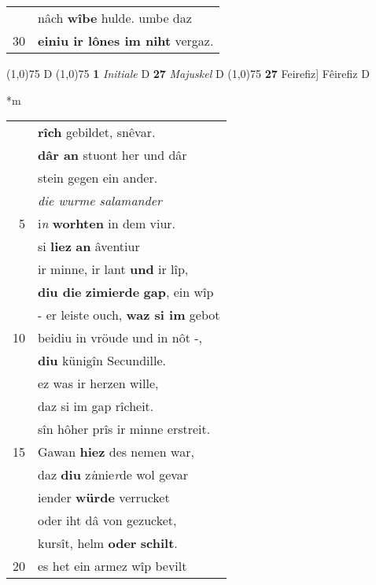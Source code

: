 \documentclass[8pt,a4paper,notitlepage]{article}
\begin{document}
\begin{table}[ht]
\begin{minipage}[t]{0.5\linewidth}
\begin{tabular}{rl}
 & nâch \textbf{wîbe} hulde. umbe daz\\ 
30 & \textbf{einiu ir lônes im niht} vergaz.\\ 
\end{tabular}
\scriptsize
\line(1,0){75} \newline
D \newline
\line(1,0){75} \newline
\textbf{1} \textit{Initiale} D  \textbf{27} \textit{Majuskel} D  \newline
\line(1,0){75} \newline
\textbf{27} Feirefiz] Fêirefiz D \newline
\end{minipage}
\hspace{0.5cm}
\begin{minipage}[t]{0.5\linewidth}
\small
\begin{center}*m
\end{center}
\begin{tabular}{rl}
 & \textbf{rîch} gebildet, snêvar.\\ 
 & \textbf{dâr an} stuont her und dâr\\ 
 & stein gegen ein ander.\\ 
 & \textit{die wurme salamander}\\ 
5 & i\textit{n} \textbf{worhten} in dem viur.\\ 
 & si \textbf{liez} \textbf{an} âventiur\\ 
 & ir minne, ir lant \textbf{und} ir lîp,\\ 
 & \textbf{diu die} \textbf{zimierde} \textbf{gap}, ein wîp\\ 
 & - er leiste ouch, \textbf{waz si im} gebot\\ 
10 & beidiu in vröude und in nôt -,\\ 
 & \textbf{diu} künigîn Secundille.\\ 
 & ez was ir herzen wille,\\ 
 & daz si im gap rîcheit.\\ 
 & sîn hôher prîs ir minne erstreit.\\ 
15 & Gawan \textbf{hiez} des nemen war,\\ 
 & daz \textbf{diu} z\textit{i}mie\textit{r}de wol gevar\\ 
 & iender \textbf{würde} verrucket\\ 
 & oder iht dâ von gezucket,\\ 
 & kursît, helm \textbf{oder} \textbf{schilt}.\\ 
20 & es het ein armez wîp bevilt\\ 

\end{tabular}
\end{minipage}
\end{table}
\end{document}
